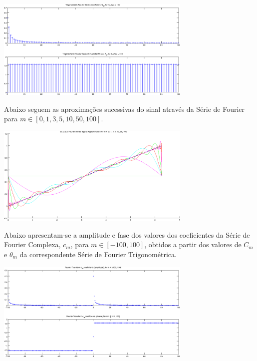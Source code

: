 \documentclass[a4paper]{article}
\begin{document}
\begin{center}
	\includegraphics[width=0.70\textwidth]{images/ex2_2_2_cm_tm.png}
	\label{fig:ex2_2_2_cm_tm}
\end{center}

\noindent Abaixo seguem as aproximações sucessivas do sinal através da Série de Fourier para $m \in [0, 1, 3, 5, 10, 50, 100]$.
\begin{center}
	\includegraphics[width=0.70\textwidth]{images/ex2_2_2_approx.png}
	\label{fig:ex2_2_2_approx}
\end{center}

\clearpage
\noindent Abaixo apresentam-se a amplitude e fase dos valores dos coeficientes da Série de Fourier Complexa, $c_m$, para $m \in [-100, 100]$, obtidos a partir dos valores de $C_m$ e $\theta_m$ da correspondente Série de Fourier Trigonométrica.
\begin{center}
	\includegraphics[width=0.70\textwidth]{images/ex2_2_2_complex_cm.png}
	\label{fig:ex2_2_2_complex_cm}
\end{center}
\end{document}
